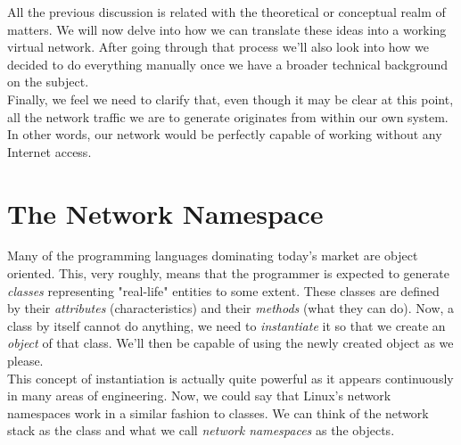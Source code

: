         All the previous discussion is related with the theoretical or conceptual realm of matters. We will now delve into how we can translate these ideas into a working virtual network. After going through that process we'll also look into how we decided to do everything manually once we have a broader technical background on the subject.\\

        Finally, we feel we need to clarify that, even though it may be clear at this point, all the network traffic we are to generate originates from within our own system. In other words, our network would be perfectly capable of working without any Internet access.\\

    \section{The Network Namespace}


        Many of the programming languages dominating today's market are object oriented. This, very roughly, means that the programmer is expected to generate \textit{classes} representing "real-life" entities to some extent. These classes are defined by their \textit{attributes} (characteristics) and their \textit{methods} (what they can do). Now, a class by itself cannot do anything, we need to \textit{instantiate} it so that we create an \textit{object} of that class. We'll then be capable of using the newly created object as we please.\\

        This concept of instantiation is actually quite powerful as it appears continuously in many areas of engineering. Now, we could say that Linux's network namespaces work in a similar fashion to classes. We can think of the network stack as the class and what we call \textit{network namespaces} as the objects.\\

